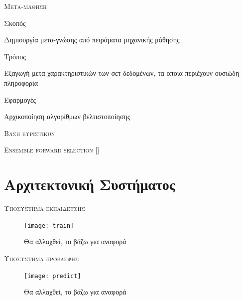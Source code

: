 \documentclass{beamer}
\begin{document}
  \begin{frame}{ \scshape Μετα-μάθηση}
  	\begin{minipage}[t]{.3\textwidth}  		
  		Σκοπός
  		\vspace{4ex}
  	\end{minipage}%
  	\begin{minipage}[t]{.6\textwidth}
  		Δημιουργία μετα-γνώσης από πειράματα μηχανικής μάθησης  	
  		\vspace{4ex}
  	\end{minipage}
  	\begin{minipage}[t]{.3\textwidth}  		
  		Τρόπος
  		\vspace{4ex}
  	\end{minipage}%
  	\begin{minipage}[t]{.6\textwidth}
  		Εξαγωγή μετα-χαρακτηριστικών των σετ δεδομένων, τα οποία περιέχουν ουσιώδη πληροφορία
  		\vspace{4ex} 
  	\end{minipage}
  	\begin{minipage}[t]{.3\textwidth}  		
  		Εφαρμογές
  		\vspace{4ex}
  	\end{minipage}%
  	\begin{minipage}[t]{.6\textwidth}
  		Αρχικοποίηση αλγορίθμων βελτιστοποίησης
  		\vspace{4ex}
  	\end{minipage}
  \end{frame}
  \begin{frame}{ \scshape Bάση ευριστικών}
  	
  \end{frame}
   \begin{frame}{ \scshape Ensemble forward selection}
   	[]
   \end{frame}
   \section{Αρχιτεκτονική Συστήματος}
   \begin{frame}{ \scshape Υποσύστημα εκπαίδευσης}
   	\begin{figure}
   		\texttt{[image: train]}
   		\caption{Θα αλλαχθεί, το βάζω για αναφορά}
   	\end{figure}
   \end{frame}
   \begin{frame}{ \scshape Υποσύστημα πρόβλεψης}
   	\begin{figure}
   		\texttt{[image: predict]}
   		\caption{Θα αλλαχθεί, το βάζω για αναφορά}
   	\end{figure}
   \end{frame}
\end{document}
